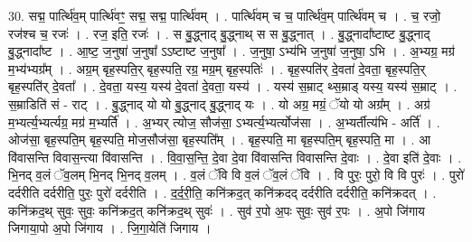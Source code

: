 \documentclass[17pt]{extarticle}
\begin{document}
30. सद्म॒ पार्त्थि॑व॒म् पार्त्थि॑वꣳ॒॒ सद्म॒ सद्म॒ पार्त्थि॑वम् । . पार्त्थि॑वम् च च॒ पार्त्थि॑व॒म् पार्त्थि॑वम् च । . च॒ रजो॒ रज॑श्च च॒ रजः॑ । . रज॒ इति॒ रजः॑ । . स बु॒द्ध्नाद् बु॒द्ध्नाथ् स स बु॒द्ध्नात् । . बु॒द्ध्नादा᳚ष्टाष्ट बु॒द्ध्नाद् बु॒द्ध्नादा᳚ष्ट । . आ॒ष्ट॒ ज॒नुषा॑ ज॒नुषा᳚ ऽऽष्टाष्ट ज॒नुषा᳚ । . ज॒नुषा॒ ऽभ्य॑भि ज॒नुषा॑ ज॒नुषा॒ ऽभि । . अ॒भ्यग्र॒ मग्र॑ म॒भ्य॑भ्यग्र᳚म् । . अग्र॒म् बृह॒स्पति॒र् बृह॒स्पति॒ रग्र॒ मग्र॒म् बृह॒स्पतिः॑ । . बृह॒स्पति॑र् दे॒वता॑ दे॒वता॒ बृह॒स्पति॒र् बृह॒स्पति॑र् दे॒वता᳚ । . दे॒वता॒ यस्य॒ यस्य॑ दे॒वता॑ दे॒वता॒ यस्य॑ । . यस्य॑ स॒म्राट् थ्स॒म्राड् यस्य॒ यस्य॑ स॒म्राट् । . स॒म्राडिति॑ सं - राट् । . बु॒द्ध्नाद् यो यो बु॒द्ध्नाद् बु॒द्ध्नाद् यः । . यो अग्र॒ मग्रं॒ ॅयो यो अग्र᳚म् । . अग्र॑ म॒भ्यर्त्य॒भ्यर्त्यग्र॒ मग्र॑ म॒भ्यर्ति॑ । . अ॒भ्यर् त्योज॒ सौज॑सा॒ ऽभ्यर्त्य॒भ्यर्त्योज॑सा । . अ॒भ्यर्तीत्य॑भि - अर्ति॑ । . ओज॑सा॒ बृह॒स्पति॒म् बृह॒स्पति॒ मोज॒सौज॑सा॒ बृह॒स्पति᳚म् । . बृह॒स्पति॒ मा बृह॒स्पति॒म् बृह॒स्पति॒ मा । . आ वि॑वासन्ति विवास॒न्त्या वि॑वासन्ति । . वि॒वा॒स॒न्ति॒ दे॒वा दे॒वा वि॑वासन्ति विवासन्ति दे॒वाः । . दे॒वा इति॑ दे॒वाः । . भि॒नद् व॒लं ॅव॒लम् भि॒नद् भि॒नद् व॒लम् । . व॒लं ॅवि वि व॒लं ॅव॒लं ॅवि । . वि पुरः॒ पुरो॒ वि वि पुरः॑ । . पुरो॑ दर्दरीति दर्दरीति॒ पुरः॒ पुरो॑ दर्दरीति । . द॒र्द॒री॒ति॒ कनि॑क्रद॒त् कनि॑क्रदद् दर्दरीति दर्दरीति॒ कनि॑क्रदत् । . कनि॑क्रद॒थ् सुवः॒ सुवः॒ कनि॑क्रद॒त् कनि॑क्रद॒थ् सुवः॑ । . सुव॑ र॒पो अ॒पः सुवः॒ सुव॑ र॒पः । . अ॒पो जि॑गाय जिगाया॒पो अ॒पो जि॑गाय । . जि॒गा॒येति॑ जिगाय । \newline
\end{document}
